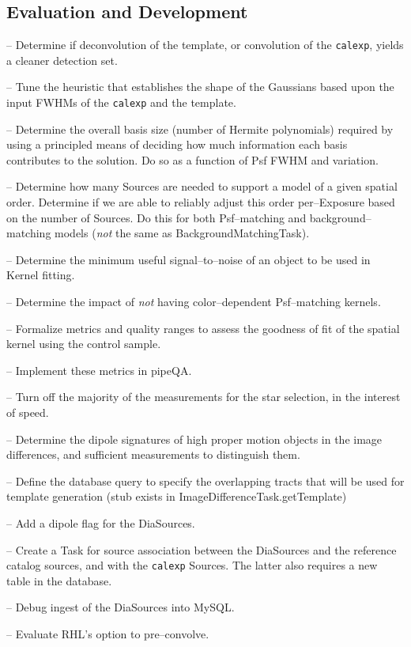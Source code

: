 \documentclass[prd, nofootinbib, floatfix, 11pt,tightenlines,times]{article}
\begin{document}
\subsection{Evaluation and Development}

-- Determine if deconvolution of the template, or convolution of the {\tt calexp},
yields a cleaner detection set.

-- Tune the heuristic that establishes the shape of the Gaussians based upon
the input FWHMs of the {\tt calexp} and the template.

-- Determine the overall basis size (number of Hermite polynomials) 
required by using a principled means of deciding how much information each basis contributes to the solution.  
Do so as a function of Psf FWHM and variation.

-- Determine how many Sources are needed to support a model of a given spatial order.   Determine
if we are able to reliably adjust this order per--Exposure based on the number of Sources.  Do this
for both Psf--matching and background--matching models ({\it not} the same as BackgroundMatchingTask).


-- Determine the minimum useful signal--to--noise of an object to be
used in Kernel fitting.

-- Determine the impact of {\it not} having color--dependent Psf--matching kernels.

-- Formalize metrics and quality ranges to assess the goodness of fit
of the spatial kernel using the control sample.

-- Implement these metrics in pipeQA.

-- Turn off the majority of the measurements for the star
selection, in the interest of speed.

-- Determine the dipole signatures of high proper motion objects in the image differences,
and sufficient measurements to distinguish them.

-- Define the database query to specify the overlapping tracts that
will be used for template generation (stub exists in
ImageDifferenceTask.getTemplate)

-- Add a dipole flag for the DiaSources.

-- Create a Task for source association between the DiaSources and the
reference catalog sources, and with the {\tt calexp} Sources.  The
latter also requires a new table in the database.

-- Debug ingest of the DiaSources into MySQL.

-- Evaluate RHL's option to pre--convolve.
\end{document}
